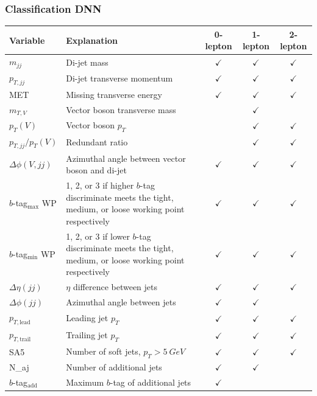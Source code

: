 \documentclass{beamer}
\begin{document}
\begin{frame}
  \frametitle{Classification DNN}

  \centering
  {\tiny
  \begin{tabularx}{\textwidth}{|l|X|c|c|c|}
    \hline
    Variable & Explanation & 0-lepton & 1-lepton & 2-lepton \\
    \hline\hline
    $m_{jj}$ & Di-jet mass & $\checkmark$ & $\checkmark$ & $\checkmark$ \\
    $p_{T,jj}$ & Di-jet transverse momentum & $\checkmark$ & $\checkmark$ & $\checkmark$ \\
    MET & Missing transverse energy & $\checkmark$ & $\checkmark$ & $\checkmark$ \\
    \hline
    $m_{T,V}$ & Vector boson transverse mass & & $\checkmark$ & \\
    $p_T(V)$ & Vector boson $p_T$ & & $\checkmark$ & $\checkmark$ \\
    $p_{T,jj}/p_T(V)$ & Redundant ratio & & $\checkmark$ & $\checkmark$ \\
    \hline
    $\Delta\phi(V, jj)$ & Azimuthal angle between vector boson and di-jet & $\checkmark$ & $\checkmark$ & $\checkmark$ \\
    $b$-tag$_\mathrm{max}$ WP & 1, 2, or 3 if higher $b$-tag discriminate meets the tight, medium, or loose working point respectively & $\checkmark$ & $\checkmark$ & $\checkmark$ \\
    $b$-tag$_\mathrm{min}$ WP & 1, 2, or 3 if lower $b$-tag discriminate meets the tight, medium, or loose working point respectively & $\checkmark$ & $\checkmark$ & $\checkmark$ \\
    \hline
    $\Delta\eta(jj)$ & $\eta$ difference between jets & $\checkmark$ & $\checkmark$ & $\checkmark$ \\
    $\Delta\phi(jj)$ & Azimuthal angle between jets & $\checkmark$ & $\checkmark$ & \\
    $p_{T, \mathrm{lead}}$ & Leading jet $p_T$ & $\checkmark$ & $\checkmark$ & $\checkmark$ \\
    \hline
    $p_{T, \mathrm{trail}}$ & Trailing jet $p_T$ & $\checkmark$ & $\checkmark$ & $\checkmark$ \\
    SA5 & Number of soft jets, $p_T > \SI{5}{GeV}$ & $\checkmark$ & $\checkmark$ & $\checkmark$ \\
    N_{aj} & Number of additional jets & $\checkmark$ & $\checkmark$ & \\
    \hline
    $b$-tag$_\mathrm{add}$ & Maximum $b$-tag of additional jets & $\checkmark$ & & \\

\end{tabularx}}
\end{frame}
\end{document}
